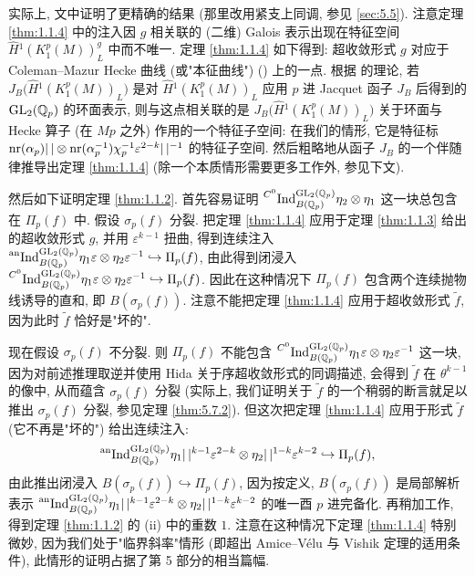 实际上, 文中证明了更精确的结果 (那里改用紧支上同调, 参见 \ref{sec:5.5}).
注意定理 \ref{thm:1.1.4} 中的注入因 $g$ 相关联的 (二维) Galois 表示出现在特征空间 $\widehat{H}{}^{1}(K_1^{p}(M))_L^{g}$ 中而不唯一.
定理 \ref{thm:1.1.4} 如下得到: 超收敛形式 $g$ 对应于 Coleman--Mazur Hecke 曲线 (或"本征曲线") (\cite{ref:17}) 上的一点.
根据 \cite{ref:24} 的理论, 若 $J_B\bigl(\widehat{H}{}^{1}(K_1^{p}(M))_L\bigr)$ 是对 $\widehat{H}{}^{1}(K_1^{p}(M))_L$ 应用 $p$ 进 Jacquet 函子 $J_B$ 后得到的 $\mathrm{GL}_2(\mathbb{Q}_p)$ 的环面表示, 则与这点相关联的是 $J_B\bigl(\widehat{H}{}^{1}(K_1^{p}(M))_L\bigr)$ 关于环面与 Hecke 算子 (在 $Mp$ 之外) 作用的一个特征子空间: 在我们的情形, 它是特征标 $\operatorname{nr}(\alpha_p)|\,| \otimes \operatorname{nr}(\alpha_p^{-1})\chi_p^{-1}\varepsilon^{2-k}|\,|^{-1}$ 的特征子空间.
然后粗略地从函子 $J_B$ 的一个伴随律推导出定理 \ref{thm:1.1.4} (除一个本质情形需要更多工作外, 参见下文).

然后如下证明定理 \ref{thm:1.1.2}.
首先容易证明 $\prescript{C^{0}}{}{\mathrm{Ind}}_{B(\mathbb{Q}_p)}^{\mathrm{GL}_2(\mathbb{Q}_p)} \eta_2 \otimes \eta_1$ 这一块总包含在 $\Pi_p(f)$ 中.
假设 $\sigma_p(f)$ 分裂.
把定理 \ref{thm:1.1.4} 应用于定理 \ref{thm:1.1.3} 给出的超收敛形式 $g$, 并用 $\varepsilon^{k-1}$ 扭曲, 得到连续注入 $\prescript{\mathrm{an}}{}{\mathrm{Ind}}_{B(\mathbb{Q}_p)}^{\mathrm{GL}_2(\mathbb{Q}_p)} \eta_1 \varepsilon \otimes \eta_2 \varepsilon^{-1} \hookrightarrow \Pi_p(f)$, 由此得到闭浸入 $\prescript{C^{0}}{}{\mathrm{Ind}}_{B(\mathbb{Q}_p)}^{\mathrm{GL}_2(\mathbb{Q}_p)} \eta_1 \varepsilon \otimes \eta_2 \varepsilon^{-1} \hookrightarrow \Pi_p(f)$.
因此在这种情况下 $\Pi_p(f)$ 包含两个连续抛物线诱导的直和, 即 $B(\sigma_p(f))$.
注意不能把定理 \ref{thm:1.1.4} 应用于超收敛形式 $\tilde{f}$, 因为此时 $\tilde{f}$ 恰好是"坏的".

现在假设 $\sigma_p(f)$ 不分裂.
则 $\Pi_p(f)$ 不能包含 $\prescript{C^{0}}{}{\mathrm{Ind}}_{B(\mathbb{Q}_p)}^{\mathrm{GL}_2(\mathbb{Q}_p)} \eta_1 \varepsilon \otimes \eta_2 \varepsilon^{-1}$ 这一块, 因为对前述推理取逆并使用 Hida 关于序超收敛形式的同调描述, 会得到 $\tilde{f}$ 在 $\theta^{k-1}$ 的像中, 从而蕴含 $\sigma_p(f)$ 分裂 (实际上, 我们证明关于 $\tilde{f}$ 的一个稍弱的断言就足以推出 $\sigma_p(f)$ 分裂, 参见定理 \ref{thm:5.7.2}).
但这次把定理 \ref{thm:1.1.4} 应用于形式 $\tilde{f}$ (它不再是"坏的") 给出连续注入:
\[
\prescript{\mathrm{an}}{}{\mathrm{Ind}}_{B(\mathbb{Q}_p)}^{\mathrm{GL}_2(\mathbb{Q}_p)} \eta_1 |\,|^{k-1}\varepsilon^{2-k} \otimes \eta_2 |\,|^{1-k}\varepsilon^{k-2} \hookrightarrow \Pi_p(f),
\]
由此推出闭浸入 $B(\sigma_p(f)) \hookrightarrow \Pi_p(f)$, 因为按定义, $B(\sigma_p(f))$ 是局部解析表示 $\prescript{\mathrm{an}}{}{\mathrm{Ind}}_{B(\mathbb{Q}_p)}^{\mathrm{GL}_2(\mathbb{Q}_p)} \eta_1 |\,|^{k-1}\varepsilon^{2-k} \otimes \eta_2 |\,|^{1-k}\varepsilon^{k-2}$ 的唯一酉 $p$ 进完备化.
再稍加工作, 得到定理 \ref{thm:1.1.2} 的 (ii) 中的重数 $1$.
注意在这种情况下定理 \ref{thm:1.1.4} 特别微妙, 因为我们处于"临界斜率"情形 (即超出 Amice--V\'elu 与 Vishik 定理的适用条件), 此情形的证明占据了第 5 部分的相当篇幅.

